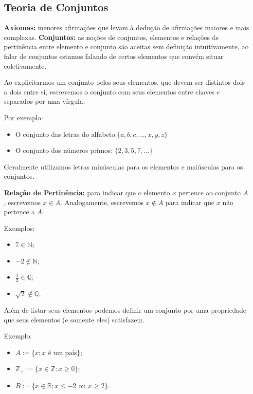 \documentclass[oneside,a4paper,12pt]{article}
\begin{document}
\subsection{Teoria de Conjuntos}
\textbf{Axiomas:} menores afirmações que levam à dedução de afirmações maiores e mais complexas.
\textbf{Conjuntos:} as noções de conjuntos, elementos e relações de pertinência entre elemento e conjunto são aceitas sem definição intuitivamente, ao falar de conjuntos estamos falando de certos elementos que convém situar coletivamente.

Ao explicitarmos um conjunto pelos seus elementos, que devem ser distintos dois a dois entre si, escrevemos o conjunto com seus elementos entre chaves e separados por uma vírgula.

Por exemplo:
\begin{itemize}
	\item O conjunto das letras do alfabeto:$\{a, b, c, \dots, x, y, z\}$
	\item O conjunto dos números primos: $\{2, 3, 5, 7, \dots\}$
\end{itemize}
	Geralmente utilizamos letras minúsculas para os elementos e maiúsculas para os conjuntos.
	
\textbf{Relação de Pertinência:} para indicar que o elemento $x$ pertence ao conjunto $A$, escrevemos $x \in A$. Analogamente, escrevemos $x \notin A$ para indicar que $x$ não pertence a $A$.

Exemplos:
\begin{multicols}{4}
\begin{itemize}
	\item $7 \in \mathbb{N}$;
	\item $-2 \notin \mathbb{N}$;
	\item $\frac{1}{2} \in \mathbb{Q}$;
	\item $\sqrt{2} \notin \mathbb{Q}$.
\end{itemize}
\end{multicols}	
	
Além de listar seus elementos podemos definir um conjunto por uma propriedade que seus elementos (e somente eles) satisfazem.

Exemplo:
\begin{itemize}
	\item $A := \{x ; x \text{ é um país}\}$;
	\item $\mathbb{Z}_{+} := \{x \in \mathbb{Z}; x \geq 0 \}$;
	\item $B := \{ x \in \mathbb{R} ; x \leq -2 \text{ ou } x \geq 2 \}$.
\end{itemize}
	
\end{document}
